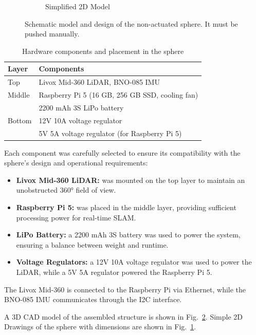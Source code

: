 \documentclass[english, bachelor, utf8]{base/thesis_telematics}
\begin{document}
\begin{figure}
\begin{subfigure}{0.4\columnwidth}
    \caption{Simplified 2D Model}
    \label{fig:2d-model}
\end{subfigure}
\caption{Schematic model and design of the non-actuated sphere.
It must be pushed manually.}
\label{fig:cad-design1}
\end{figure}
\begin{table}
\centering
\caption{Hardware components and placement in the sphere}
\label{tab:hardware_components_non_actuated}
\begin{tabularx}{\linewidth}{@{}l X@{}}
\toprule
\textbf{Layer} & \textbf{Components} \\
\midrule
Top    & Livox Mid-360 LiDAR, BNO-085 IMU \\
Middle & Raspberry Pi 5 (16 GB, 256 GB SSD, cooling fan) \\
       & 2200 mAh 3S LiPo battery \\
Bottom & 12V 10A voltage regulator \\
       & 5V 5A voltage regulator (for Raspberry Pi 5) \\

\bottomrule
\end{tabularx}
\vspace{-1em}
\end{table}

Each component was carefully selected to ensure its compatibility with the sphere's design and operational requirements:
\begin{itemize}
    \item \textbf{Livox Mid-360 LiDAR:} was mounted on the top layer to maintain an unobstructed 360° field of view.
    \item \textbf{Raspberry Pi 5:} was placed in the middle layer, providing sufficient processing power for real-time SLAM.
    \item \textbf{LiPo Battery:} a 2200 mAh 3S battery was used to power the system, ensuring a balance between weight and runtime.
    \item \textbf{Voltage Regulators:} a 12V 10A voltage regulator was used to power the LiDAR, while a 5V 5A regulator powered the Raspberry Pi 5.
\end{itemize}
The Livox Mid-360 is connected to the Raspberry Pi via Ethernet, while the BNO-085 IMU communicates through the I2C interface. 

A 3D CAD model of the assembled structure is shown in Fig.~\ref{fig:cad-design1}.
Simple 2D Drawings of the sphere with dimensions are shown in Fig.~\ref{fig:2d-model}.
\end{document}
